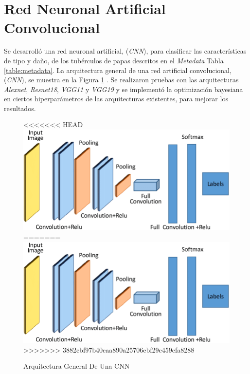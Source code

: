 	\section{Red Neuronal Artificial Convolucional}

	Se desarrolló una red neuronal artificial, (\textit{CNN}), para clasificar las características de tipo y daño, de los tubérculos de papas descritos en el \textit{Metadata} Tabla \ref{table:metadata}. La arquitectura general de una red artificial convolucional, (\textit{CNN}), se muestra en la Figura \ref{fig:cnnarchitecture} \cite{cnnarchitecture}. Se realizaron pruebas con las arquitecturas \textit{Alexnet}, \textit{Resnet18}, \textit{VGG11} y \textit{VGG19} y se implementó la optimización bayesiana en ciertos hiperparámetros de las arquitecturas existentes, para mejorar los resultados. 
	
	\begin{figure}[ht]
		\centering
<<<<<<< HEAD
		\includegraphics[scale=0.15]{Figs/A-generic-CNN-Architecture.png}
=======
		\includegraphics[scale=0.18]{Figs/A-generic-CNN-Architecture.png}
>>>>>>> 3882cbf97b40caa890a25706ebf29e459efa8288
		\caption{Arquitectura General De Una CNN}
		\label{fig:cnnarchitecture}
	\end{figure}	
	
